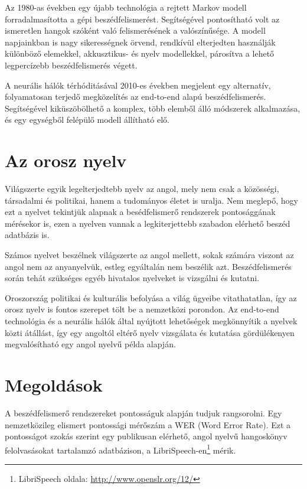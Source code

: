 Az 1980-as években egy újabb technológia a rejtett Markov modell forradalmasította a gépi beszédfelismerést. Segítségével pontosítható volt az ismeretlen hangok szóként való felismerésének a valószínűsége. A modell napjainkban is nagy sikerességnek örvend, rendkívül elterjedten használják különböző elemekkel, akkusztikus- és nyelv modellekkel, párosítva a lehető legpercízebb beszédfelismerés végett.

A neurális hálók térhóditásával 2010-es években megjelent egy alternatív, folyamatosan terjedő megközelítés az end-to-end alapú beszédfelismerés. Segítségével kiküszöbölhető a komplex, több elemből álló módszerek alkalmazása, és egy egységből felépülő modell állítható elő.

\section{Az orosz nyelv}

Világszerte egyik legelterjedtebb nyelv az angol, mely nem csak a közösségi, társadalmi és politikai, hanem a tudományos életet is uralja. Nem meglepő, hogy ezt a nyelvet tekintjük alapnak a besédfelismerő rendszerek pontosággának mérésekor is, ezen a nyelven vannak a legkiterjettebb szabadon elérhető beszéd adatbázis is.

Számos nyelvet beszélnek világszerte az angol mellett, sokak számára viszont az angol nem az anyanyelvük, estleg egyáltalán nem beszélik azt. Beszédfelismerés során tehát szükséges egyéb hivatalos nyelveket is vizsgálni és kutatni.

Oroszország politikai és kulturális befolyása a világ ügyeibe vitathatatlan, így az orosz nyelv is fontos szerepet tölt be a nemzetközi porondon. Az end-to-end technológia és a neurális hálók által nyújtott lehetőségek megkönnyítik a nyelvek közti átállást, így egy angoltól eltérő nyelv vizsgálata és kutatása gördülékenyen megvalósítható egy angol nyelvű példa alapján.

\section{Megoldások}

A beszédfelismerő rendszereket pontosságuk alapján tudjuk rangsorolni. Egy nemzetközileg elismert pontossági mérőszám a WER (Word Error Rate). Ezt a pontosságot szokás szerint egy publikusan elérhető, angol nyelvű hangoskönyv felolvasásokat tartalamzó adatbázison, a LibriSpeech-en\footnote{LibriSpeech oldala: \url{http://www.openslr.org/12/}} mérik.

